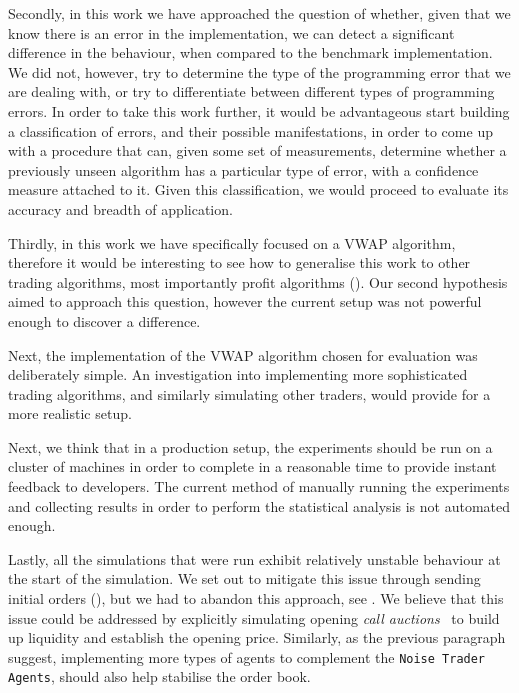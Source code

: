 Secondly, in this work we have approached the question of whether, given that we know there is an error in the implementation, we can detect a  significant difference in the behaviour, when compared to the benchmark implementation. We did not, however, try to determine the type of the programming error that we are dealing with, or try to differentiate between different types of programming errors. In order to take this work further, it would be advantageous start building a classification of errors, and their possible manifestations, in order to come up with a procedure that can, given some set of measurements, determine whether a previously unseen algorithm has a particular type of error, with a confidence measure attached to it. Given this classification, we would proceed to evaluate its accuracy and breadth of application.

Thirdly, in this work we have specifically focused on a VWAP algorithm, therefore it would be interesting to see how to generalise this work to other trading algorithms, most importantly profit algorithms (). Our second hypothesis aimed to approach this question, however the current setup was not powerful enough to discover a difference.

Next, the implementation of the VWAP algorithm chosen for evaluation was deliberately simple. An investigation into implementing more sophisticated trading algorithms, and similarly simulating other traders, would provide for a more realistic setup.

Next, we think that in a production setup, the experiments should be run on a cluster of machines in order to complete in a reasonable time to provide instant feedback to developers. The current method of manually running the experiments and collecting results in order to perform the statistical analysis is not automated enough. 

Lastly, all the simulations that were run exhibit relatively unstable behaviour at the start of the simulation. We set out to mitigate this issue through sending initial orders (), but we had to abandon this approach, see . We believe that this issue could be addressed by explicitly simulating opening \textit{call auctions}~\cite{Comerton2004} to build up liquidity and establish the opening price. Similarly, as the previous paragraph suggest, implementing more types of agents to complement the \texttt{Noise Trader Agents}, should also help stabilise the order book.

